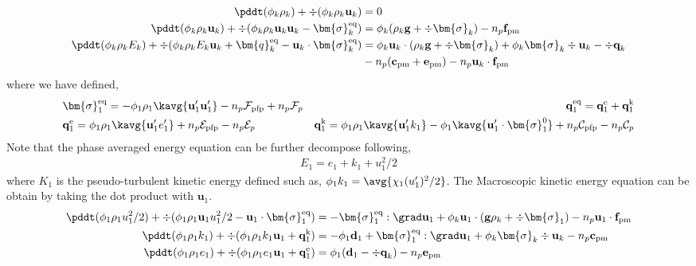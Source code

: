 \begin{align}
    \pddt (\phi_k \rho_k)  
    + \div (
        \phi_k \rho_k\textbf{u}_k
    )
    &= 
    0\\
    \pddt (\phi_k \rho_k\textbf{u}_k)  
    + \div (
        \phi_k \rho_k\textbf{u}_k\textbf{u}_k
        - \bm{\sigma}_k^\text{eq}
    )
    &= 
    \phi_k  (\rho_k\textbf{g} + \div \bm{\sigma}_k )
    - n_p \textbf{f}_\text{pm}\\
    \pddt (\phi_k\rho_kE_k)  
    + \div (
        \phi_k\rho_kE_k\textbf{u}_k
        + \bm{q}_k^\text{eq}
        - \textbf{u}_k \cdot \bm{\sigma}_k^\text{eq}
        )
    &= 
    \phi_k \textbf{u}_k\cdot (\rho_k\textbf{g} 
    + \div \bm{\sigma}_k) 
    + \phi_k \bm{\sigma}_k \div\textbf{u}_k
    - \div\textbf{q}_k\\
    & - n_p (\textbf{c}_\text{pm}
    + \textbf{e}_\text{pm})
    - n_p \textbf{u}_k \cdot \textbf{f}_\text{pm}
\end{align} 
where we have defined, 
\begin{align*}
    &\bm{\sigma}_1^\text{eq}
    = - \phi_1\rho_1 
        \kavg{\textbf{u}_1'\textbf{u}_1'}
        - n_p \mathcal{F}_\text{pfp} + n_p \mathcal{F}_p
    &\textbf{q}_1^\text{eq}
    =\textbf{q}_1^\text{e} 
    +\textbf{q}_1^\text{k}  
    \\
    &\textbf{q}_1^\text{e}
    = \phi_1\rho_1 \kavg{\textbf{u}_1' e_1'} 
    + n_p \mathcal{E}_\text{pfp} 
    - n_p \mathcal{E}_p 
    &\textbf{q}_1^\text{k}
    = \phi_1\rho_1 \kavg{\textbf{u}_1' k_1} 
    - \phi_1\kavg{\textbf{u}_1' \cdot \bm{\sigma}_1^0} 
    + n_p \mathcal{C}_\text{pfp} 
    - n_p \mathcal{C}_p 
\end{align*}
Note that the phase averaged energy equation can be further decompose following, 
\begin{align*}
    E_1 = e_1 + k_1 + u_1^2/2
\end{align*}
where $K_1$ is the pseudo-turbulent kinetic energy defined such as, $\phi_1 k_1 = \avg{\chi_1 (u_1')^2/2}$. 
The Macroscopic kinetic energy equation can be obtain by taking the dot product with $\textbf{u}_1$. 
\begin{align}
    \pddt (\phi_1 \rho_1u_1^2/2)  
    + \div (
        \phi_1 \rho_1\textbf{u}_1u_1^2/2
        - \textbf{u}_1 \cdot \bm{\sigma}_1^\text{eq}
    )
    &= 
    - \bm{\sigma}_1^\text{eq} : \grad \textbf{u}_1
    + \phi_k \textbf{u}_1 \cdot 
    (\textbf{g} \rho_k
    + \div \bm{\sigma}_1
    )
    -  n_p \textbf{u}_1\cdot \textbf{f}_\text{pm}\\
    \pddt (\phi_1\rho_1k_1)  
    + \div (
        \phi_1\rho_1k_1\textbf{u}_1
        + \textbf{q}_1^\text{k} 
        )
    &= 
    - \phi_1 \textbf{d}_1 
    + \bm{\sigma}_1^\text{eq}  : \grad \textbf{u}_1
    + \phi_k \bm{\sigma}_k \div\textbf{u}_k
    -n_p  \textbf{c}_\text{pm}\\
    \pddt (\phi_1\rho_1e_1)  
    + \div (
        \phi_1 \rho_1e_1\textbf{u}_1
        +
        \textbf{q}_1^\text{e} 
        )
    &= 
    \phi_1 (\textbf{d}_1 
    - \div \textbf{q}_k)
    - n_p \textbf{e}_\text{pm}
\end{align}
